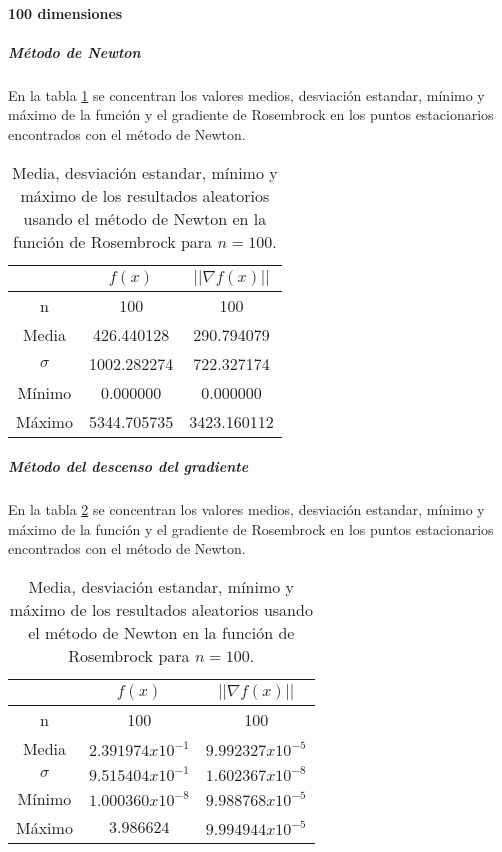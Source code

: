 \paragraph{100 dimensiones}

\subparagraph{Método de Newton}

En la tabla \ref{table:rosembrock_100_random_newton} se concentran los valores medios, desviación estandar, mínimo y máximo de la función y el gradiente de Rosembrock en los puntos estacionarios encontrados con el método de Newton.

\begin{table}[H]
    \centering
    \begin{tabular}{ccc} \hline
                 & $f(x)$      & $||\nabla f(x)||$ \\ \hline
        n        & 100         & 100               \\
        Media    & 426.440128  & 290.794079        \\
        $\sigma$ & 1002.282274 & 722.327174        \\
        Mínimo   & 0.000000    & 0.000000          \\
        Máximo   & 5344.705735 & 3423.160112       \\ \hline
    \end{tabular}
    \caption{Media, desviación estandar, mínimo y máximo de los resultados aleatorios usando el método de Newton en la función de Rosembrock para $n=100$.}
    \label{table:rosembrock_100_random_newton}
\end{table}

\subparagraph{Método del descenso del gradiente}

En la tabla \ref{table:rosembrock_100_random_gradient} se concentran los valores medios, desviación estandar, mínimo y máximo de la función y el gradiente de Rosembrock en los puntos estacionarios encontrados con el método de Newton.

\begin{table}[H]
    \centering
    \begin{tabular}{ccc} \hline
                 & $f(x)$             & $||\nabla f(x)||$  \\ \hline
        n        & 100                & 100                \\
        Media    & $2.391974x10^{-1}$ & $9.992327x10^{-5}$ \\
        $\sigma$ & $9.515404x10^{-1}$ & $1.602367x10^{-8}$ \\
        Mínimo   & $1.000360x10^{-8}$ & $9.988768x10^{-5}$ \\
        Máximo   & $3.986624$         & $9.994944x10^{-5}$ \\ \hline
    \end{tabular}
    \caption{Media, desviación estandar, mínimo y máximo de los resultados aleatorios usando el método de Newton en la función de Rosembrock para $n=100$.}
    \label{table:rosembrock_100_random_gradient}
\end{table}